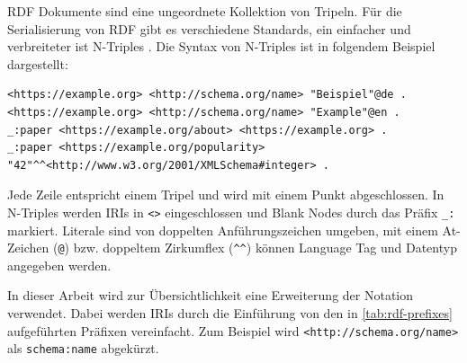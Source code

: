 RDF Dokumente sind eine ungeordnete Kollektion von Tripeln.
Für die Serialisierung von RDF gibt es verschiedene Standards, ein einfacher und verbreiteter ist N-Triples \cite{rdf-ntriples}.
Die Syntax von N-Triples ist in folgendem Beispiel dargestellt:
\begin{lstlisting}[language=SPARQL, breaklines=true]
<https://example.org> <http://schema.org/name> "Beispiel"@de .
<https://example.org> <http://schema.org/name> "Example"@en .
_:paper <https://example.org/about> <https://example.org> .
_:paper <https://example.org/popularity> "42"^^<http://www.w3.org/2001/XMLSchema#integer> .
\end{lstlisting}
Jede Zeile entspricht einem Tripel und wird mit einem Punkt abgeschlossen.
In N-Triples werden IRIs in \verb|<>| eingeschlossen und Blank Nodes durch das Präfix \verb|_:| markiert.
Literale sind von doppelten Anführungszeichen umgeben, mit einem At-Zeichen (\verb|@|) bzw. doppeltem Zirkumflex (\verb|^^|) können Language Tag und Datentyp angegeben werden.

In dieser Arbeit wird zur Übersichtlichkeit eine Erweiterung der Notation verwendet.
Dabei werden IRIs durch die Einführung von den in \cref{tab:rdf-prefixes} aufgeführten Präfixen vereinfacht.
Zum Beispiel wird \verb|<http://schema.org/name>| als \verb|schema:name| abgekürzt. 

